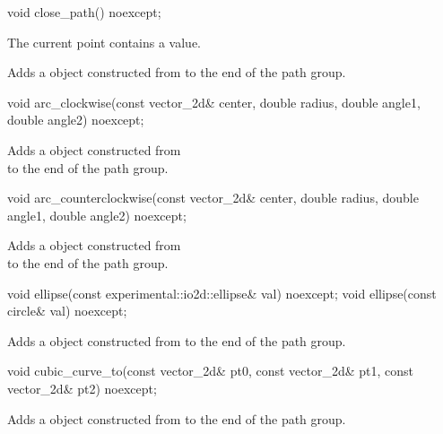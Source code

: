 \begin{itemdecl}
void close_path() noexcept;
\end{itemdecl}
\begin{itemdescr}
\pnum
\requires
The current point contains a value.

\pnum
\effects
Adds a  object constructed from  to the end of the path group.
\end{itemdescr}

\begin{itemdecl}
void arc_clockwise(const vector_2d& center, double radius, double angle1,
  double angle2) noexcept;
\end{itemdecl}
\begin{itemdescr}
\pnum
\effects
Adds a  object constructed from \\  to the end of the path group.
\end{itemdescr}

\begin{itemdecl}
void arc_counterclockwise(const vector_2d& center, double radius,
  double angle1, double angle2) noexcept;
\end{itemdecl}
\begin{itemdescr}
\pnum
\effects
Adds a  object constructed from \\
to the end of the path group.
\end{itemdescr}

\begin{itemdecl}
void ellipse(const experimental::io2d::ellipse& val) noexcept;
void ellipse(const circle& val) noexcept;
\end{itemdecl}
\begin{itemdescr}
\pnum
\effects
Adds a  object constructed from  to the end of the path group.
\end{itemdescr}

\begin{itemdecl}
void cubic_curve_to(const vector_2d& pt0, const vector_2d& pt1,
  const vector_2d& pt2) noexcept;
\end{itemdecl}
\begin{itemdescr}
\pnum
\effects
\pnum
Adds a  object constructed from  to the end of the path group.
\end{itemdescr}


